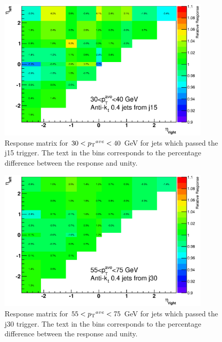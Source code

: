 \begin{figure}
\centering
\includegraphics[width=0.9\textwidth]{figures/JetPerformance/2011/j15TwoDPlotBoth.eps}
\caption[The response matrix for jets with $30<\ptave{}<40$ GeV]{
Response matrix for $30<\ptave{}<40$ GeV for jets which passed the j15 trigger. 
The text in the bins corresponds to the percentage difference between the response and unity.
\label{JetPerf:ResponseMatrix_30_40_j15}}
\end{figure}

\begin{figure}
\centering
\includegraphics[width=0.9\textwidth]{figures/JetPerformance/2011/j30TwoDPlotBoth.eps}
\caption[The response matrix for jets with $55<\ptave{}<75$ GeV]{
Response matrix for $55<\ptave{}<75$ GeV for jets which passed the j30 trigger. 
The text in the bins corresponds to the percentage difference between the response and unity.
\label{JetPerf:ResponseMatrix_55_75_j30}}
\end{figure}


